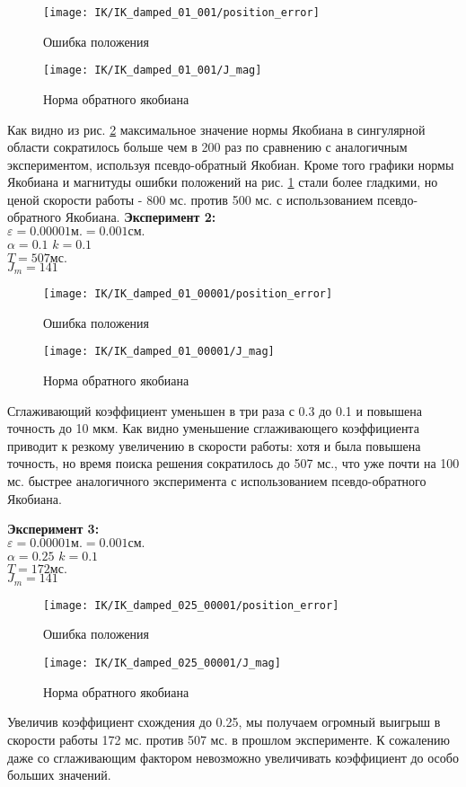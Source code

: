 \begin{figure}[h!]
	\centering
	\texttt{[image: IK/IK\_damped\_01\_001/position\_error]}
	\caption{Ошибка положения}
	\label{fig:3_5_1}
\end{figure}
\begin{figure}[h!]
	\centering
	\texttt{[image: IK/IK\_damped\_01\_001/J\_mag]}
	\caption{Норма обратного якобиана}
	\label{fig:3_5_2}
\end{figure}
Как видно из рис. \ref{fig:3_5_2} максимальное значение нормы Якобиана в сингулярной области сократилось больше чем в 200 раз по сравнению с аналогичным экспериментом, используя псевдо-обратный Якобиан. Кроме того графики нормы Якобиана и магнитуды ошибки положений на рис. \ref{fig:3_5_1} стали более гладкими, но ценой скорости работы - 800 мс. против 500 мс. с использованием псевдо-обратного Якобиана.
\bigbreak
\textbf{Эксперимент 2:}\\
$\varepsilon = 0.00001\text{м.} = 0.001\text{см.}$\\
$\alpha = 0.1$
$k = 0.1$\\
$T = 507 \text{мс.}$\\
$J_{m} = 141$

\begin{figure}[h!]
	\centering
	\texttt{[image: IK/IK\_damped\_01\_00001/position\_error]}
	\caption{Ошибка положения}
	\label{fig:3_5_3}
\end{figure}
\begin{figure}[h!]
	\centering
	\texttt{[image: IK/IK\_damped\_01\_00001/J\_mag]}
	\caption{Норма обратного якобиана}
	\label{fig:3_5_4}
\end{figure}
Сглаживающий коэффициент уменьшен в три раза с 0.3 до 0.1 и повышена точность до 10 мкм. Как видно уменьшение сглаживающего коэффициента приводит к резкому увеличению в скорости работы: хотя и была повышена точность, но время поиска решения сократилось до 507 мс., что уже почти на 100 мс. быстрее аналогичного эксперимента с использованием псевдо-обратного Якобиана.

\textbf{Эксперимент 3:}\\
$\varepsilon = 0.00001\text{м.} = 0.001\text{см.}$\\
$\alpha = 0.25$
$k = 0.1$\\
$T = 172 \text{мс.}$\\
$J_{m} = 141$

\begin{figure}[h!]
	\centering
	\texttt{[image: IK/IK\_damped\_025\_00001/position\_error]}
	\caption{Ошибка положения}
	\label{fig:3_5_5}
\end{figure}
\begin{figure}[h!]
	\centering
	\texttt{[image: IK/IK\_damped\_025\_00001/J\_mag]}
	\caption{Норма обратного якобиана}
	\label{fig:3_5_6}
\end{figure}
Увеличив коэффициент схождения до 0.25, мы получаем огромный выигрыш в скорости работы 172 мс. против 507 мс. в прошлом эксперименте. К сожалению даже со сглаживающим фактором невозможно увеличивать коэффициент до особо больших значений.

